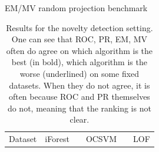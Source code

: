\documentclass[9pt]{beamer}
\begin{document}
\begin{frame}{EM/MV random projection benchmark}
\begin{table}[!ht]
\centering
\footnotesize
\caption{\footnotesize Results for the novelty detection setting. One can see that ROC, PR, EM, MV often do agree on which algorithm is the best (in bold), which algorithm is the worse (underlined) on some fixed datasets. When they do not agree, it is often because ROC and PR themselves do not, meaning that the ranking is not clear.}
\tabcolsep=0.11cm
\resizebox{\linewidth}{!} {
\begin{tabular}{l cccc c cccc c cccc}
\toprule
Dataset      & \multicolumn{4}{c}{iForest}& & \multicolumn{4}{c}{OCSVM}&  & \multicolumn{4}{c}{LOF} \\ %
  \cmidrule{1-15}


\end{tabular}}
\end{table}
\end{frame}
\end{document}
